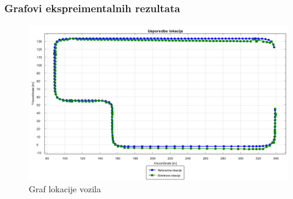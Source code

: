 \subsubsection{Grafovi ekspreimentalnih rezultata}
\begin{figure}[H]
  \includegraphics[scale=0.4]{images/algo1/primjer3/usporedba_lokacija.png}
  \caption{Graf lokacije vozila}
  \label{eval:a1p3_lokacija}
\end{figure}
